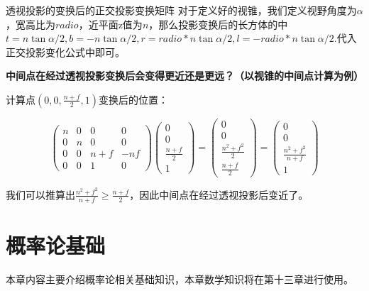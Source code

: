\documentclass[openany]{progbookcn}
\begin{document}
\begin{titledbox}{透视投影的变换后的正交投影变换矩阵}
	对于定义好的视锥，我们定义视野角度为$\alpha$，宽高比为$radio$，近平面z值为$n$，那么投影变换后的长方体的中$t=n\tan{\alpha/2}, b=-n\tan{\alpha/2}, r=radio*n\tan{\alpha/2},l=-radio*n\tan{\alpha/2}$.代入正交投影变化公式中即可。
\end{titledbox}

\begin{question}
	\textbf{中间点在经过透视投影变换后会变得更近还是更远？（以视锥的中间点计算为例）}
	
	计算点$(0,0,\frac{n+f}{2},1)$变换后的位置：
	
	\begin{equation}
		\begin{pmatrix}n&0&0&0\\0&n&0&0\\0&0&n+f&-nf\\0&0&1&0\end{pmatrix}\begin{pmatrix}0\\0\\\frac{n+f}{2}\\1\end{pmatrix} = \begin{pmatrix}0\\0\\\frac{n^2+f^2}{2}\\\frac{n+f}{2}\end{pmatrix} =  \begin{pmatrix}0\\0\\\frac{n^2+f^2}{n+f}\\1\end{pmatrix}
	\end{equation}

	我们可以推算出$\frac{n^2+f^2}{n+f}\ge\frac{n+f}{2}$，因此中间点在经过透视投影后变近了。
\end{question}

\chapter{概率论基础}

本章内容主要介绍概率论相关基础知识，本章数学知识将在第十三章进行使用。
\end{document}
